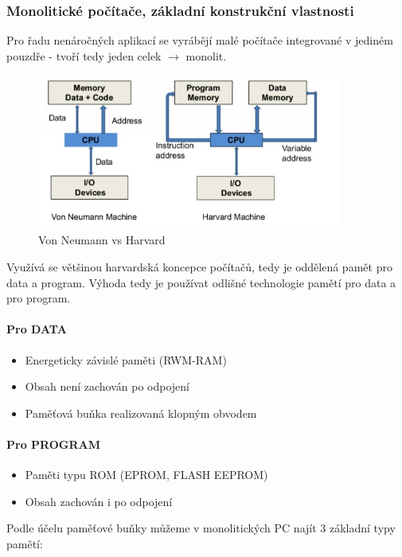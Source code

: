 \documentclass[10pt,a4paper]{article}
\begin{document}
\subsubsection{Monolitické počítače, základní konstrukční vlastnosti}
Pro řadu nenáročných aplikací se vyrábějí malé počítače integrované v jediném pouzdře - tvoří tedy jeden celek $\rightarrow$ monolit.
\begin{figure}
    \centering
    \includegraphics[width=10cm]{app_monolit-arch.png}
    \caption{Von Neumann vs Harvard}
    \label{fig:app_monolit-arch2}
\end{figure}
Využívá se většinou harvardská koncepce počítačů, tedy je oddělená pamět pro data a program. Výhoda tedy je používat odlišné technologie pamětí pro data a pro program.

\paragraph{Pro DATA}
\begin{itemize}
\item Energeticky závislé paměti (RWM-RAM)
\item Obsah není zachován po odpojení
\item Paměťová buňka realizovaná klopným obvodem
\end{itemize}


\paragraph{Pro PROGRAM}
\begin{itemize}
\item Paměti typu ROM (EPROM, FLASH EEPROM)
\item Obsah zachován i po odpojení
\end{itemize}

Podle účelu paměťové buňky můžeme v monolitických PC najít 3 základní typy pamětí:
\end{document}
